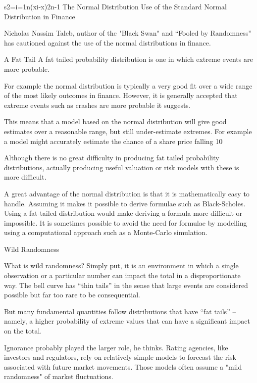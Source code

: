 


s2=i=1n(xi-x)2n-1
The Normal Distribution
Use of the Standard Normal Distribution in Finance

Nicholas Nassim Taleb, author of the "Black Swan" and “Fooled by Randomness” has cautioned against the use of the normal distributions in finance.

A Fat Tail
A fat tailed probability distribution is one in which extreme events are more probable.

For example the normal distribution is typically a very good fit over a wide range of the most likely outcomes in finance. However, it is generally accepted that extreme events such as crashes are more probable it suggests.

This means that a model based on the normal distribution will give good estimates over a reasonable range, but still under-estimate extremes. For example a model might accurately estimate the chance of a share price falling 10%

Although there is no great difficulty in producing fat tailed probability distributions, actually producing useful valuation or risk models with these is more difficult.

A great advantage of the normal distribution is that it is mathematically easy to handle. Assuming it makes it possible to derive formulae such as Black-Scholes. Using a fat-tailed distribution would make deriving a formula more difficult or impossible. It is sometimes possible to avoid the need for formulae by modelling using a computational approach such as a Monte-Carlo simulation.



Wild Randomness

What is wild randomness? Simply put, it is an environment in which a single observation or a particular number can impact the total in a disproportionate way. The bell curve has “thin tails” in the sense that large events are considered possible but far too rare to be consequential. 

But many fundamental quantities follow distributions that have “fat tails” – namely, a higher probability of extreme values that can have a significant impact on the total.

Ignorance probably played the larger role, he thinks. Rating agencies, like investors and regulators, rely on relatively simple models to forecast the risk associated with future market movements. Those models often assume a "mild randomness" of market fluctuations. 

